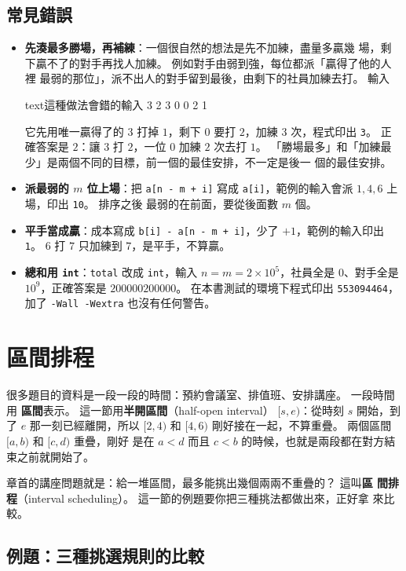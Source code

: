 \subsection{常見錯誤}

\begin{itemize}
\item \textbf{先湊最多勝場，再補練}：一個很自然的想法是先不加練，盡量多贏幾
場，剩下贏不了的對手再找人加練。 例如對手由弱到強，每位都派「贏得了他的人裡
最弱的那位」，派不出人的對手留到最後，由剩下的社員加練去打。 輸入
\begin{code}{text}{這種做法會錯的輸入}
3 2
3 0 0
2 1
\end{code}
它先用唯一贏得了的 $3$ 打掉 $1$，剩下 $0$ 要打 $2$，加練 $3$ 次，程式印出
\texttt{3}。 正確答案是 $2$：讓 $3$ 打 $2$，一位 $0$ 加練 $2$ 次去打 $1$。
「勝場最多」和「加練最少」是兩個不同的目標，前一個的最佳安排，不一定是後一
個的最佳安排。
\item \textbf{派最弱的 $m$ 位上場}：把 \texttt{a[n - m + i]} 寫成
\texttt{a[i]}，範例的輸入會派 $1, 4, 6$ 上場，印出 \texttt{10}。 排序之後
最弱的在前面，要從後面數 $m$ 個。
\item \textbf{平手當成贏}：成本寫成 \texttt{b[i] - a[n - m + i]}，少了
$+1$，範例的輸入印出 \texttt{1}。 $6$ 打 $7$ 只加練到 $7$，是平手，不算贏。
\item \textbf{總和用 \texttt{int}}：\texttt{total} 改成 \texttt{int}，輸入
$n = m = 2 \times 10^5$，社員全是 $0$、對手全是 $10^9$，正確答案是
$200000200000$。 在本書測試的環境下程式印出 \texttt{553094464}，加了
\texttt{-Wall -Wextra} 也沒有任何警告。
\end{itemize}

\section{區間排程}
\label{sec:interval-scheduling}

很多題目的資料是一段一段的時間：預約會議室、排值班、安排講座。 一段時間用
\textbf{區間}表示。 這一節用\textbf{半開區間}（half-open interval）
$[s, e)$：從時刻 $s$ 開始，到了 $e$ 那一刻已經離開，所以 $[2, 4)$ 和
$[4, 6)$ 剛好接在一起，不算重疊。 兩個區間 $[a, b)$ 和 $[c, d)$ 重疊，剛好
是在 $a < d$ 而且 $c < b$ 的時候，也就是兩段都在對方結束之前就開始了。

章首的講座問題就是：給一堆區間，最多能挑出幾個兩兩不重疊的？ 這叫\textbf{區
間排程}（interval scheduling）。 這一節的例題要你把三種挑法都做出來，正好拿
來比較。

\subsection{例題：三種挑選規則的比較}
\label{sec:ex-three-rules}

